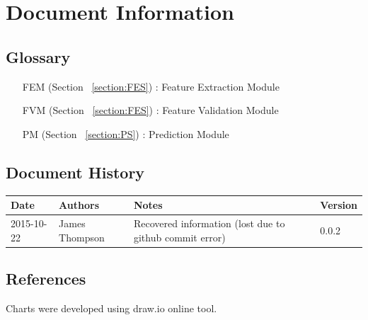 \documentclass[10pt, twoside]{article}
\begin{document}
\section{Document Information}

\subsection{Glossary}
\begin{itemize}
\item[FEM (Section ~\ref{section:FES}) :] Feature Extraction Module
\item[FVM (Section ~\ref{section:FES}) :] Feature Validation Module
\item[PM (Section ~\ref{section:PS}) :] Prediction Module
\end{itemize}

\subsection{Document History}
\begin{tabular}{|p{}|p{}|p{}|p{}|} \hline
Date & Authors & Notes & Version \\ \hline
2015-10-22 & James Thompson & Recovered information (lost
due to github commit error) & 0.0.2 \\ \hline
\end{tabular}

\subsection{References}
Charts were developed using draw.io online tool.
\end{document}

